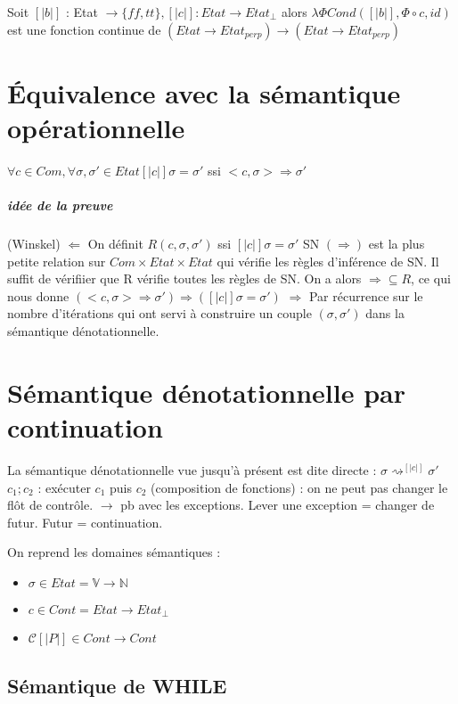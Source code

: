 \documentclass[10pt,a4paper]{article}
\newcommand{\sem}[1]{$\left[| #1 | \right]$}
\newcommand{\semm}[1]{\left[| #1 | \right]}
\newcommand{\V}{\mathbb{V}}
\newcommand{\N}{\mathbb{N}}
\begin{document}
\begin{thm}{} Soit \sem{b} : Etat $\to \{ff, tt \}, \semm{c} : Etat \to Etat_{\perp}$
alors $\lambda \Phi Cond( \semm{b}, \Phi \circ c, id)$ est une fonction continue de $(Etat \to Etat_{perp}) \to (Etat \to Etat_{perp})$
\end{thm}

\section{Équivalence avec la sémantique opérationnelle}
\begin{thm}{} $\forall c \in Com, \forall \sigma, \sigma' \in Etat
\semm{c} \sigma = \sigma'$ ssi $<c, \sigma> \Rightarrow \sigma'$
\end{thm}
\subparagraph{idée de la preuve}(Winskel)
\vbox{$\Leftarrow$} On définit $R(c, \sigma, \sigma')$ ssi $\semm{c} \sigma = \sigma'$
SN $(\Rightarrow)$ est la plus petite relation sur $Com \times Etat \times Etat$ qui vérifie les règles d'inférence de SN.
Il suffit de vérifiier que R vérifie toutes les règles de SN.
On a alors $\Rightarrow \subseteq R$, ce qui nous donne $(<c, \sigma> \Rightarrow \sigma') \Longrightarrow (\semm{c} \sigma = \sigma')$
\vbox{$\Rightarrow$} Par récurrence sur le nombre d'itérations qui ont servi à construire un couple $(\sigma, \sigma')$ dans la sémantique dénotationnelle.


\section{Sémantique dénotationnelle par continuation}

La sémantique dénotationnelle vue jusqu'à présent est dite directe : $ \sigma \rightsquigarrow^{\semm{c}} \sigma'$
$c_1;c_2$ : exécuter $c_1$ puis $c_2$ (composition de fonctions) : on ne peut pas changer le flôt de contrôle.
$\longrightarrow $ pb avec les exceptions.
Lever une exception = changer de futur.
Futur = continuation.

On reprend les domaines sémantiques : 
\begin{itemize}
 \item $\sigma \in Etat = \V \to \N$
 \item $c \in Cont = Etat \to Etat_{\perp}$
 \item $\mathcal{C} \semm{P} \in Cont \to Cont$
\end{itemize}

\subsection{Sémantique de WHILE}
\end{document}
